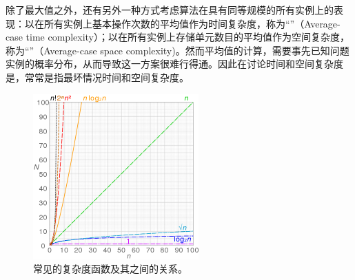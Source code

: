         
       除了最大值之外，还有另外一种方式考虑算法在具有同等规模的所有实例上的表现：以在所有实例上基本操作次数的平均值作为时间复杂度，称为“”（Average-case time complexity）；以在所有实例上存储单元数目的平均值作为空间复杂度，称为“”（Average-case space complexity)。然而平均值的计算，需要事先已知问题实例的概率分布，从而导致这一方案很难行得通。因此在讨论时间和空间复杂度是，常常是指最坏情况时间和空间复杂度。
        
        	\begin{figure}[hpt]\centering
		\centering
        	\includegraphics[width=2.5in]{Time-complexity.png}
		\caption{\fangsong 常见的复杂度函数及其之间的关系。}
    \end{figure}
        
 
    
